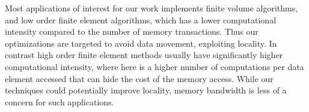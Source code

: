 Most applications of interest for our work implements finite volume algorithms, 
and low order finite element algorithms, which has a lower computational 
intensity compared to the number of memory transactions. Thus our optimizations 
are targeted to avoid data movement, exploiting locality. In contrast high 
order finite element methods usually have significantly higher computational 
intensity, where here is a higher number of computations per data element 
accessed that can hide the cost of the memory access. While our techniques could 
potentially improve locality, memory bandwidth is less of a concern for such 
applications.


